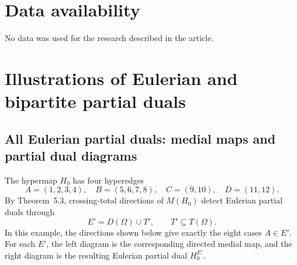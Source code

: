 \documentclass{article}
\begin{document}
\section*{Data availability}
No data was used for the research described in the article.






\newpage
\appendix
\section{Illustrations of Eulerian and bipartite partial duals}
\label{app:illustrations}
\subsection{All Eulerian partial duals: medial maps and partial dual diagrams}

The hypermap \(H_0\) has four hyperedges
\[
A=(1,2,3,4),\quad B=(5,6,7,8),\quad C=(9,10),\quad D=(11,12).
\]
By Theorem~5.3, crossing-total directions of \(M(H_0)\) detect Eulerian
partial duals through
\[
E'=D(\Omega)\cup T',\qquad T'\subseteq T(\Omega).
\]
In this example, the directions shown below give exactly the eight cases
\(A\in E'\). For each \(E'\), the left diagram is the corresponding
directed medial map, and the right diagram is the resulting Eulerian
partial dual \(H^{E'}_0\).
\end{document}
